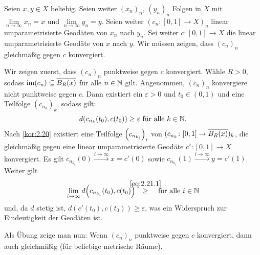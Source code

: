 \begin{beweis}
	Seien $x,y \in X$ beliebig.
	Seien weiter $(x_n)_n$, $(y_n)_n$ Folgen in $X$ mit $\lim\limits_{n \rightarrow \infty} x_n = x$ und $\lim\limits_{n \rightarrow \infty} y_n = y$.
	Seien weiter $(c_n\colon [0,1] \rightarrow X)_n$ linear umparametrisierte Geodäten von $x_n$ nach $y_n$.
	Sei weiter $c \colon [0,1] \rightarrow X$ die linear umparametrisierte Geodäte von $x$ nach $y$.
	Wir müssen zeigen, dass $(c_n)_n$ gleichmäßig gegen $c$ konvergiert.
	
	Wir zeigen zuerst, dass $(c_n)_n$ punktweise gegen $c$ konvergiert.
	Wähle $R > 0$, sodass $\im(c_n) \subseteq \ol{B_R(x)}$ für alle $n \in \NN$ gilt.
	Angenommen, $(c_n)_n$ konvergiere nicht punktweise gegen $c$.
	Dann existiert ein $\varepsilon > 0$ und $t_0 \in (0,1)$ und eine Teilfolge $(c_{n_k})_k$, sodass gilt:
	\begin{equation}
		d(c_{n_k}(t_0),c(t_0)) \geq \varepsilon \text{ für alle } k \in \NN. \label{eq:2.21.1}
	\end{equation}
	Nach \autoref{kor:2.20} existiert eine Teilfolge $\enbrace*{c_{n_{k_i}}}_i$ von $(c_{n_k}\colon [0,1] \rightarrow \ol{B_R(x)})_k$, die gleichmäßig gegen eine linear umparametrisierte Geodäte $c'\colon [0,1] \rightarrow X$ konvergiert.
	Es gilt $c_{n_{k_i}}(0) \xrightarrow{i \rightarrow \infty} x = c'(0)$ sowie $c_{n_{k_i}}(1) \xrightarrow{i \rightarrow \infty} y = c'(1)$.
	Weiter gilt
	\[
		\lim\limits_{i \rightarrow \infty} d\enbrace*{c_{n_{k_i}}(t_0),c(t_0)} \stack{\eqref{eq:2.21.1}}{\geq} \text{ für alle } i \in \NN
	\]
	und, da $d$ stetig ist, $d(c'(t_0),c(t_0)) \geq \varepsilon$, was ein Widerspruch zur Eindeutigkeit der Geodäten ist.
	
	Als Übung zeige man nun: Wenn $(c_n)_n$ punktweise gegen $c$ konvergiert, dann auch gleichmäßig (für beliebige metrische Räume). \qedhere
\end{beweis}


